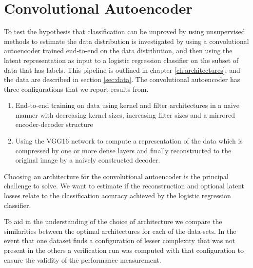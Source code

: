 \section{Convolutional Autoencoder}

To test the hypothesis that classification can be improved by using unsupervised methods to estimate the data distribution is investigated by using a convolutional autoencoder trained end-to-end on the data distribution, and then using the latent representation as input to a logistic regression classifier on the subset of data that has labels. This pipeline is outlined in chapter \ref{ch:architectures}, and the data are described in section \ref{sec:data}. The convolutional autoencoder has three configurations that we report results from. 
\begin{enumerate}[start=0, label={(\bfseries Ar\arabic*):}, ref={(Ar\arabic*)}]
	\item \label{item:clf_no_vgg} End-to-end training on data using kernel and filter architectures in a naive manner with decreasing kernel sizes, increasing filter sizes and a mirrored encoder-decoder structure
	\item \label{item:clf_freeze_vgg} Using the VGG16 network to compute a representation of the data which is compressed by one or more dense layers and finally reconstructed to the original image by a naively constructed decoder. 
\end{enumerate}

\noindent Choosing an architecture for the convolutional autoencoder is the principal challenge to solve. We want to estimate if the reconstruction and optional latent losses relate to the classification accuracy achieved by the logistic regression classifier. 

To aid in the understanding of the choice of architecture we compare the similarities between the optimal architectures for each of the data-sets. In the event that one dataset finds a configuration of lesser complexity that was not present in the others a verification run was computed with that configuration to ensure the validity of the performance measurement. 



